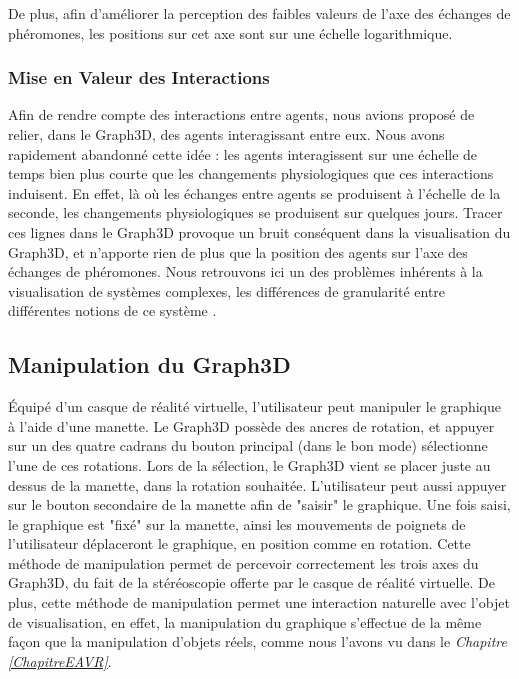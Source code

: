 	De plus, afin d'améliorer la perception des faibles valeurs de l'axe des échanges de phéromones, les positions sur cet axe sont sur une échelle logarithmique.
	
	\subsubsection{Mise en Valeur des Interactions}
	Afin de rendre compte des interactions entre agents, nous avions proposé de relier, dans le Graph3D, des agents interagissant entre eux. Nous avons rapidement abandonné cette idée : les agents interagissent sur une échelle de temps bien plus courte que les changements physiologiques que ces interactions induisent. En effet, là où les échanges entre agents se produisent à l'échelle de la seconde, les changements physiologiques se produisent sur quelques jours. Tracer ces lignes dans le Graph3D provoque un bruit conséquent dans la visualisation du Graph3D, et n'apporte rien de plus que la position des agents sur l'axe des échanges de phéromones. Nous retrouvons ici un des problèmes inhérents à la visualisation de systèmes complexes, les différences de granularité entre différentes notions de ce système \cite{hutzler_du_2000}.
	
	\subsection{Manipulation du Graph3D}
	
		Équipé d'un casque de réalité virtuelle, l'utilisateur peut manipuler le graphique à l'aide d'une manette. Le Graph3D possède des ancres de rotation, et appuyer sur un des quatre cadrans du bouton principal (dans le bon mode) sélectionne l'une de ces rotations. Lors de la sélection, le Graph3D vient se placer juste au dessus de la manette, dans la rotation souhaitée. L'utilisateur peut aussi appuyer sur le bouton secondaire de la manette afin de "saisir" le graphique. Une fois saisi, le graphique est "fixé" sur la manette, ainsi les mouvements de poignets de l'utilisateur déplaceront le graphique, en position comme en rotation. Cette méthode de manipulation permet de percevoir correctement les trois axes du Graph3D, du fait de la stéréoscopie offerte par le casque de réalité virtuelle. De plus, cette méthode de manipulation permet une interaction naturelle avec l'objet de visualisation, en effet, la manipulation du graphique s'effectue de la même façon que la manipulation d'objets réels, comme nous l'avons vu dans le \textit{Chapitre \ref{ChapitreEAVR}}.
		

